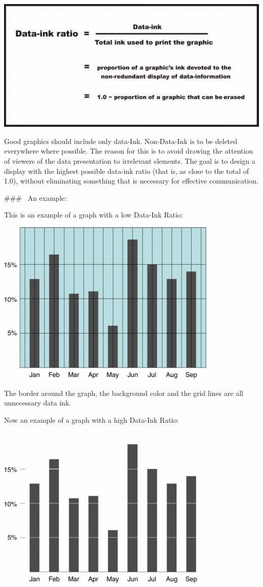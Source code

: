 \documentclass[
]{book}
\begin{document}
\includegraphics{imgs/data_ink_ratio.jpg}

Good graphics should include only data-Ink. Non-Data-Ink is to be deleted everywhere where possible. The reason for this is to avoid drawing the attention of viewers of the data presentation to irrelevant elements.
The goal is to design a display with the highest possible data-ink ratio (that is, as close to the total of 1.0), without eliminating something that is necessary for effective communication.

\#\#\#~ An example:

This is an example of a graph with a low Data-Ink Ratio:

\includegraphics{imgs/low_data_ink_ratio.png}

The border around the graph, the background color and the grid lines are all unnecessary data ink.

Now an example of a graph with a high Data-Ink Ratio:

\includegraphics{imgs/high_data_ink_ratio.png}
\end{document}
